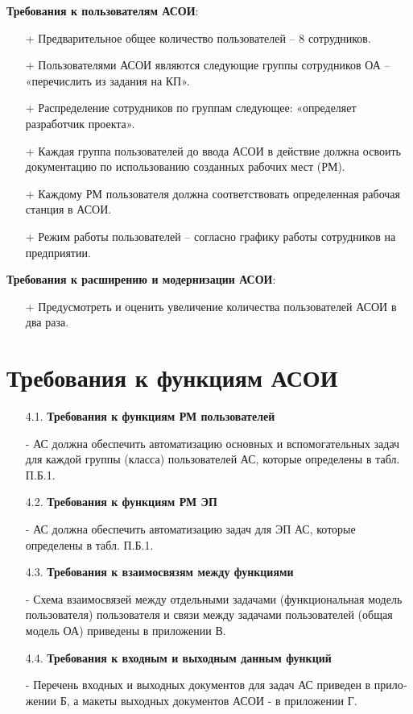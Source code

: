 \documentclass[12pt, a4paper, simple]{eskdtext}
\begin{document}
    \textbf{Требования к пользователям АСОИ}: 
    \begin{itemize}
        \item[+] Предварительное общее количество пользователей – 8 сотрудников.
        \item[+] Пользователями АСОИ являются следующие группы сотрудников ОА – «перечислить из задания на КП».
        \item[+] Распределение сотрудников по группам следующее: «определяет разработчик проекта».
        \item[+] Каждая группа пользователей до ввода АСОИ в действие должна освоить документацию по использо­ва­нию созданных рабочих мест (РМ). 
        \item[+] Каждому РМ пользователя должна соответствовать определенная рабочая станция в АСОИ.
        \item[+] Режим работы пользователей – согласно графику работы сотрудников на предприятии.
    \end{itemize}

    \textbf{Требования к расширению и модернизации АСОИ}: 
    \begin{itemize}
        \item[+] Предусмотреть и оценить увеличение количества пользователей АСОИ в два раза.
    \end{itemize}

    \section{Требования к функциям АСОИ}

    \begin{enumerate}
        \item[4.1.] \textbf{Требования к функциям РМ пользователей}
        \item[-] АС должна обеспечить автоматизацию основных
        и вспомогательных задач для каждой группы (класса) пользователей АС,
        которые определены в табл. П.Б.1.
        \item[4.2.] \textbf{Требования к функциям РМ ЭП}
        \item[-] АС должна обеспечить автоматизацию задач для ЭП АС, которые определены в табл. П.Б.1.
        \item[4.3.] \textbf{Требования к взаимосвязям между функциями}
        \item[-] Схема взаимосвязей между отдельными задачами (функциональная модель пользователя)
        пользо­ва­теля и связи между задачами пользователей (общая модель ОА) приведены в приложе­нии В.
        \item[4.4.] \textbf{Требования к входным и выходным данным функций}
        \item[-] Перечень входных и выходных документов для задач АС приведен в прило­же­нии Б,
        а макеты вы­ход­ных документов АСОИ - в приложении Г.
    \end{enumerate}
\end{document}
